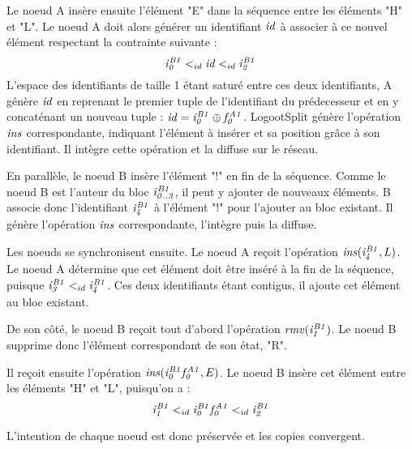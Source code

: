 Le noeud A insère ensuite l'élément "E" dans la séquence entre les éléments "H" et "L".
Le noeud A doit alors générer un identifiant $\mathit{id}$ à associer à ce nouvel élément respectant la contrainte suivante :
\begin{equation*}
  \mathit{i}^{\mathit{B1}}_{\mathit{0}} <_{id} \mathit{id} <_{id} \mathit{i}^{\mathit{B1}}_{\mathit{2}}
\end{equation*}
L'espace des identifiants de taille 1 étant saturé entre ces deux identifiants, A génère $\mathit{id}$ en reprenant le premier tuple de l'identifiant du prédecesseur et en y concaténant un nouveau tuple : $\mathit{id} = \mathit{i}^{\mathit{B1}}_{\mathit{0}} \oplus \mathit{f}^{\mathit{A1}}_{\mathit{0}}$.
LogootSplit génère l'opération $\mathit{ins}$ correspondante, indiquant l'élément à insérer et sa position grâce à son identifiant.
Il intègre cette opération et la diffuse sur le réseau.

En parallèle, le noeud B insère l'élément "!" en fin de la séquence.
Comme le noeud B est l'auteur du bloc $\mathit{i}^{\mathit{B1}}_{\mathit{0..3}}$, il peut y ajouter de nouveaux éléments.
B associe donc l'identifiant $\mathit{i}^{\mathit{B1}}_{\mathit{4}}$ à l'élément "!" pour l'ajouter au bloc existant.
Il génère l'opération $\mathit{ins}$ correspondante, l'intègre puis la diffuse.

Les noeuds se synchronisent ensuite.
Le noeud A reçoit l'opération $\mathit{ins}(\mathit{i}^{\mathit{B1}}_{\mathit{4}},L)$.
Le noeud A détermine que cet élément doit être inséré à la fin de la séquence, puisque $\mathit{i}^{\mathit{B1}}_{\mathit{3}} <_{id} \mathit{i}^{\mathit{B1}}_{\mathit{4}}$.
Ces deux identifiants étant contigus, il ajoute cet élément au bloc existant.

De son côté, le noeud B reçoit tout d'abord l'opération $\mathit{rmv}(\mathit{i}^{\mathit{B1}}_{\mathit{1}})$.
Le noeud B supprime donc l'élément correspondant de son état, "R".

Il reçoit ensuite l'opération $\mathit{ins}(\mathit{i}^{\mathit{B1}}_{\mathit{0}}\mathit{f}^{\mathit{A1}}_{\mathit{0}},E)$.
Le noeud B insère cet élément entre les éléments "H" et "L", puisqu'on a :
\begin{equation*}
  \mathit{i}^{\mathit{B1}}_{\mathit{1}} <_{id} \mathit{i}^{\mathit{B1}}_{\mathit{0}}\mathit{f}^{\mathit{A1}}_{\mathit{0}} <_{id} \mathit{i}^{\mathit{B1}}_{\mathit{2}}
\end{equation*}

L'intention de chaque noeud est donc préservée et les copies convergent.
